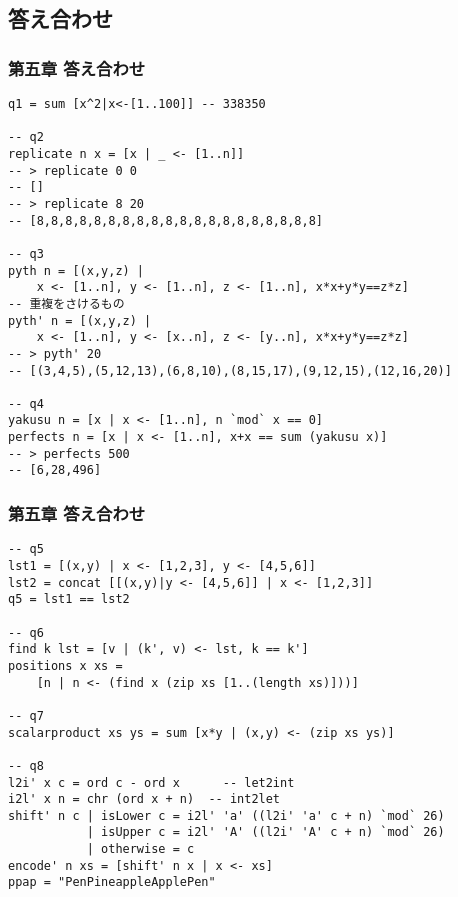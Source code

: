 \documentclass[dvipdfmx,cjk,xcolor=dvipsnames,envcountsect,notheorems,12pt]{beamer}
\theoremstyle{definition}
\begin{document}
\begin{appendix}




\section{答え合わせ}

\begin{frame}[fragile]
  \frametitle{第五章 答え合わせ}
  
\begin{lstlisting}[basicstyle={\ttfamily\scriptsize}]
q1 = sum [x^2|x<-[1..100]] -- 338350

-- q2
replicate n x = [x | _ <- [1..n]]
-- > replicate 0 0
-- []
-- > replicate 8 20
-- [8,8,8,8,8,8,8,8,8,8,8,8,8,8,8,8,8,8,8,8]

-- q3
pyth n = [(x,y,z) |
    x <- [1..n], y <- [1..n], z <- [1..n], x*x+y*y==z*z]
-- 重複をさけるもの
pyth' n = [(x,y,z) | 
    x <- [1..n], y <- [x..n], z <- [y..n], x*x+y*y==z*z]
-- > pyth' 20
-- [(3,4,5),(5,12,13),(6,8,10),(8,15,17),(9,12,15),(12,16,20)]

-- q4
yakusu n = [x | x <- [1..n], n `mod` x == 0]
perfects n = [x | x <- [1..n], x+x == sum (yakusu x)]
-- > perfects 500
-- [6,28,496]
\end{lstlisting}
\end{frame}


\begin{frame}[fragile]
  \frametitle{第五章 答え合わせ}
  
\begin{lstlisting}[basicstyle={\ttfamily\scriptsize}]
-- q5 
lst1 = [(x,y) | x <- [1,2,3], y <- [4,5,6]]
lst2 = concat [[(x,y)|y <- [4,5,6]] | x <- [1,2,3]]
q5 = lst1 == lst2

-- q6
find k lst = [v | (k', v) <- lst, k == k']
positions x xs = 
    [n | n <- (find x (zip xs [1..(length xs)]))]

-- q7
scalarproduct xs ys = sum [x*y | (x,y) <- (zip xs ys)]

-- q8
l2i' x c = ord c - ord x      -- let2int
i2l' x n = chr (ord x + n)  -- int2let
shift' n c | isLower c = i2l' 'a' ((l2i' 'a' c + n) `mod` 26)
           | isUpper c = i2l' 'A' ((l2i' 'A' c + n) `mod` 26)
           | otherwise = c
encode' n xs = [shift' n x | x <- xs]
ppap = "PenPineappleApplePen"
\end{lstlisting}
\end{frame}

\begin{frame}

\end{frame}


\end{appendix}
\end{document}
